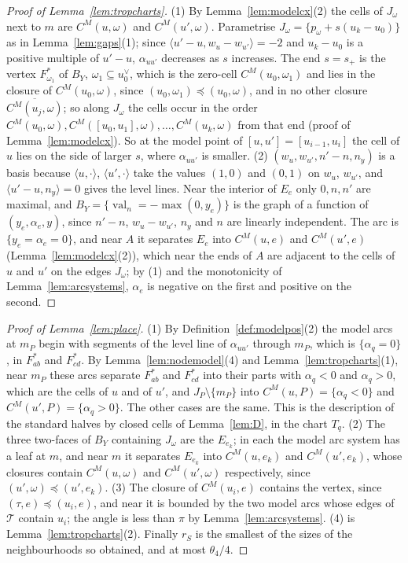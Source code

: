 \begin{proof}[Proof of Lemma~\ref{lem:tropcharts}]
(1) By Lemma~\ref{lem:modelcx}(2) the cells of $J_\omega$ next to $m$ are $C^M(u,\omega)$ and $C^M(u',\omega)$. Parametrise
$J_\omega=\{p_\omega+s(u_k-u_0)\}$ as in Lemma~\ref{lem:gaps}(1); since $\langle u'-u,w_u-w_{u'}\rangle=-2$ and $u_k-u_0$ is a
positive multiple of $u'-u$, $\alpha_{uu'}$ decreases as $s$ increases. The end $s=s_+$ is the vertex $F^*_{\omega_1}$ of
$B_Y$, $\omega_1\subseteq u_0^\vee$, which is the zero-cell $C^M(u_0,\omega_1)$ and lies in the closure of $C^M(u_0,\omega)$,
since $(u_0,\omega_1)\preceq(u_0,\omega)$, and in no other closure $\overline{C^M(u_j,\omega)}$; so along $J_\omega$ the cells
occur in the order $C^M(u_0,\omega),C^M([u_0,u_1],\omega),\dots,C^M(u_k,\omega)$ from that end (proof of
Lemma~\ref{lem:modelcx}). So at the model
point of $[u,u']=[u_{i-1},u_i]$ the cell of $u$ lies on the side of larger $s$, where $\alpha_{uu'}$ is smaller.
(2) $(w_u,w_{u'},n'-n,n_y)$ is a basis because $\langle u,\cdot\rangle$, $\langle u',\cdot\rangle$ take the values $(1,0)$ and
$(0,1)$ on $w_u$, $w_{u'}$, and $\langle u'-u,n_y\rangle=0$ gives the level lines. Near the interior of $E_e$ only $0,n,n'$ are
maximal, and $B_Y=\{\operatorname{val}_n=-\max(0,y_e)\}$ is the graph of a function of $(y_e,\alpha_e,y)$, since $n'-n$,
$w_u-w_{u'}$, $n_y$ and $n$ are linearly independent. The arc is $\{y_e=\alpha_e=0\}$, and near $A$ it separates $E_e$ into
$C^M(u,e)$ and $C^M(u',e)$ (Lemma~\ref{lem:modelcx}(2)), which near the ends of $A$ are adjacent to the cells of $u$ and
$u'$ on the edges $J_\omega$; by (1) and the monotonicity of Lemma~\ref{lem:arcsystems}, $\alpha_e$ is negative on the first
and positive on the second.
\end{proof}

\begin{proof}[Proof of Lemma~\ref{lem:place}]
(1) By Definition~\ref{def:modelpos}(2) the model arcs at $m_P$ begin with segments of the level line of $\alpha_{uu'}$
through $m_P$, which is $\{\alpha_q=0\}$, in $F^*_{ab}$ and $F^*_{cd}$. By Lemma~\ref{lem:nodemodel}(4) and
Lemma~\ref{lem:tropcharts}(1), near $m_P$ these arcs separate $F^*_{ab}$ and $F^*_{cd}$ into their parts with $\alpha_q<0$ and
$\alpha_q>0$, which are the cells of $u$ and of $u'$, and $J_P\setminus\{m_P\}$ into $C^M(u,P)=\{\alpha_q<0\}$ and
$C^M(u',P)=\{\alpha_q>0\}$. The other cases are the same. This is the description of the standard halves by closed cells
of Lemma~\ref{lem:D}, in the chart $T_q$. (2) The three two-faces of $B_Y$ containing $J_\omega$ are the $E_{e_k}$; in each
the model arc system has a leaf at $m$, and near $m$ it separates $E_{e_k}$ into $C^M(u,e_k)$ and $C^M(u',e_k)$, whose
closures contain $C^M(u,\omega)$ and $C^M(u',\omega)$ respectively, since $(u',\omega)\preceq(u',e_k)$. (3) The closure of
$C^M(u_i,e)$ contains the vertex, since $(\tau,e)\preceq(u_i,e)$, and near it is bounded by the two model arcs whose edges
of $\mathcal T$ contain $u_i$; the angle is less than $\pi$ by Lemma~\ref{lem:arcsystems}. (4) is
Lemma~\ref{lem:tropcharts}(2). Finally $r_S$ is the smallest of the sizes of the neighbourhoods so obtained, and at most
$\theta_4/4$.
\end{proof}

